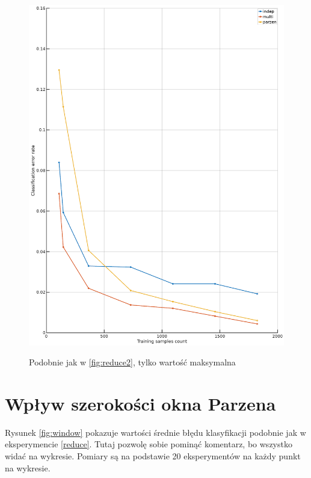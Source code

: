 \documentclass[a4paper]{article}
\begin{document}
\begin{figure}[h]
    \caption[]{Podobnie jak w \ref{fig:reduce2}, tylko wartość maksymalna}
    \centering
    \includegraphics[width=1.0\textwidth]{reduceMax.png}
    \label{fig:reduce3}
\end{figure}

\section{Wpływ szerokości okna Parzena}\label{parzen}

Rysunek \ref{fig:window} pokazuje wartości średnie błędu klasyfikacji podobnie jak w eksperymencie \ref{reduce}.
Tutaj pozwolę sobie pominąć komentarz, bo wszystko widać na wykresie.
Pomiary są na podstawie 20 eksperymentów na każdy punkt na wykresie.
\end{document}
